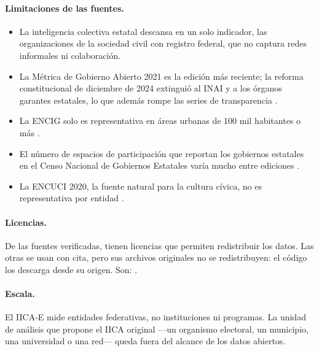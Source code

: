 \documentclass[11pt,a4paper]{article}
\begin{document}



\paragraph{Limitaciones de las fuentes.}
\begin{itemize}
  \item La inteligencia colectiva estatal descansa en un solo indicador, las organizaciones de la sociedad civil con registro federal, que no captura redes informales ni colaboración.
  \item La Métrica de Gobierno Abierto 2021 \parencite{inai_cide_mga_2021} es la edición más reciente; la reforma constitucional de diciembre de 2024 extinguió al INAI y a los órganos garantes estatales, lo que además rompe las series de transparencia \parencite{inegi_cntaippdpe_2025}.
  \item La ENCIG solo es representativa en áreas urbanas de 100 mil habitantes o más \parencite{inegi_encig_2025}.
  \item El número de espacios de participación que reportan los gobiernos estatales en el Censo Nacional de Gobiernos Estatales varía mucho entre ediciones \parencite{inegi_cnge_2025}.
  \item La ENCUCI 2020, la fuente natural para la cultura cívica, no es representativa por entidad \parencite{inegi_encuci_2020}.
\end{itemize}

\paragraph{Licencias.} De las \NFuentesVerificadas{} fuentes verificadas, \NAbiertasVerif{} tienen licencias que permiten redistribuir los datos. Las otras \NNoRedistrib{} se usan con cita, pero sus archivos originales no se redistribuyen: el código los descarga desde su origen. Son: .

\paragraph{Escala.} El IICA-E mide entidades federativas, no instituciones ni programas. La unidad de análisis que propone el IICA original ---un organismo electoral, un municipio, una universidad o una red--- queda fuera del alcance de los datos abiertos.

\end{document}
